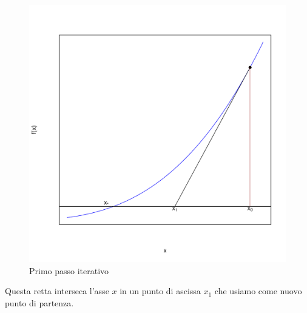 \documentclass[onecolumn,11pt]{book}\usepackage[]{graphicx}\usepackage[]{color}
\makeatletter
\def\maxwidth{ %
  \ifdim\Gin@nat@width>\linewidth
    \linewidth
  \else
    \Gin@nat@width
  \fi
}
\newenvironment{knitrout}{}{} %
\makeatother
\begin{document}
\begin{figure}
\begin{center}
\begin{knitrout}
\color{fgcolor}
\includegraphics[width=\maxwidth]{figure/step0-1} 

\end{knitrout}
\end{center}
\caption{Primo passo iterativo}
\label{fig:newton1}
\end{figure}
Questa retta interseca l'asse $x$ in un punto di ascissa $x_1$ che usiamo come nuovo punto di partenza.
\end{document}
